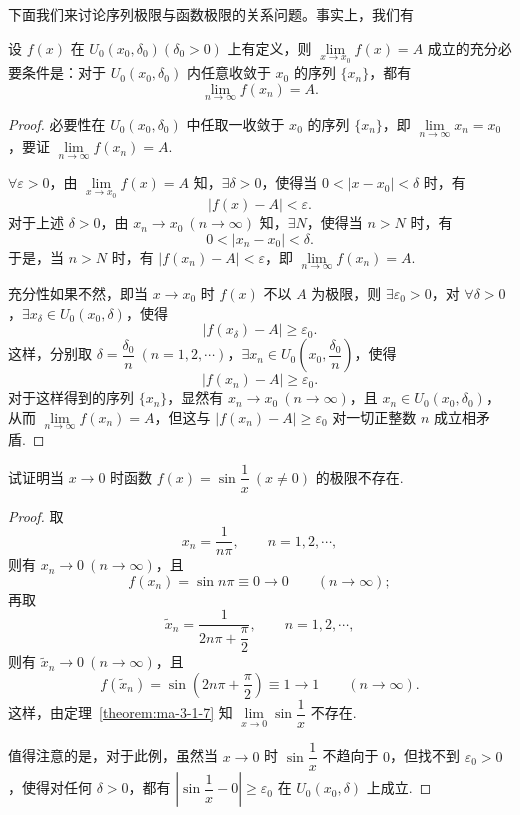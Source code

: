 下面我们来讨论序列极限与函数极限的关系问题。事实上，我们有

\begin{theorem}\label{theorem:ma-3-1-7}
设 $f(x)$ 在 $U_0(x_0,\delta_0)(\delta_0>0)$ 上有定义，则 $\lim\limits_{x\to x_0}f(x)=A$ 成立的充分必要条件是：对于 $U_0(x_0,\delta_0)$ 内任意收敛于 $x_0$ 的序列 $\{x_n\}$，都有
\[
  \lim_{n\to\infty}f(x_n)=A.
\]
\end{theorem}


\begin{proof}
必要性\quad 在 $U_0(x_0,\delta_0)$ 中任取一收敛于 $x_0$ 的序列 $\{x_n\}$，即 $\lim\limits_{n\to\infty}x_n=x_0$，要证 $\lim\limits_{n\to\infty}f(x_n)=A$.

$\forall\varepsilon>0$，由 $\lim\limits_{x\to x_0}f(x)=A$ 知，$\exists\delta>0$，使得当 $0<|x-x_0|<\delta$ 时，有
\[
  |f(x)-A|<\varepsilon.
\]
对于上述 $\delta>0$，由 $x_n\to x_0\ (n\to\infty)$ 知，$\exists N$，使得当 $n>N$ 时，有
\[
  0<|x_n-x_0|<\delta.
\]
于是，当 $n>N$ 时，有 $|f(x_n)-A|<\varepsilon$，即 $\lim\limits_{n\to\infty}f(x_n)=A$.

充分性\quad 如果不然，即当 $x\to x_0$ 时 $f(x)$ 不以 $A$ 为极限，则 $\exists\varepsilon_0>0$，对 $\forall\delta>0$，$\exists x_\delta\in U_0(x_0,\delta)$，使得
\[
  |f(x_\delta)-A|\geqslant\varepsilon_0.
\]
这样，分别取 $\delta=\dfrac{\delta_0}{n}\ (n=1,2,\cdots)$，$\exists x_n\in U_0\left(x_0,\dfrac{\delta_0}{n}\right)$，使得
\[
  |f(x_n)-A|\geqslant\varepsilon_0.
\]
对于这样得到的序列 $\{x_n\}$，显然有 $x_n\to x_0\ (n\to\infty)$，且 $x_n\in U_0(x_0,\delta_0)$，从而 $\lim\limits_{n\to\infty}f(x_n)=A$，但这与 $|f(x_n)-A|\geqslant\varepsilon_0$ 对一切正整数 $n$ 成立相矛盾.
\end{proof}


\begin{example}\label{example:ma-3-1-12}
试证明当 $x\to0$ 时函数 $f(x)=\sin\dfrac1x\ (x\ne0)$ 的极限不存在.
\end{example}


\begin{proof}
取
\[
  x_n=\frac1{n\pi},\qquad n=1,2,\cdots,
\]
则有 $x_n\to0\ (n\to\infty)$，且
\[
  f(x_n)=\sin n\pi\equiv0\to0\qquad (n\to\infty);
\]
再取
\[
  \widetilde{x}_n=\frac1{2n\pi+\dfrac{\pi}{2}},\qquad n=1,2,\cdots,
\]
则有 $\widetilde{x}_n\to0\ (n\to\infty)$，且
\[
  f(\widetilde{x}_n)=\sin\left(2n\pi+\frac{\pi}{2}\right)\equiv1\to1\qquad (n\to\infty).
\]
这样，由定理~\ref{theorem:ma-3-1-7} 知 $\lim\limits_{x\to0}\sin\dfrac1x$ 不存在.

值得注意的是，对于此例，虽然当 $x\to0$ 时 $\sin\dfrac1x$ 不趋向于 $0$，但找不到 $\varepsilon_0>0$，使得对任何 $\delta>0$，都有 $\left|\sin\dfrac1x-0\right|\geqslant\varepsilon_0$ 在 $U_0(x_0,\delta)$ 上成立.
\end{proof}


